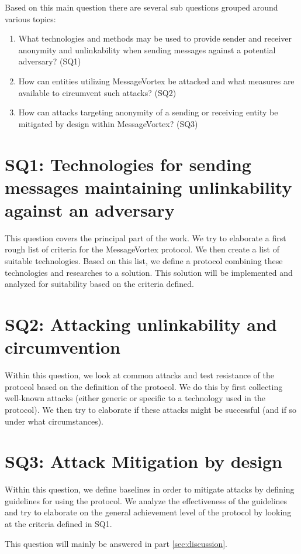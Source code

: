 Based on this main question there are several sub questions grouped around various topics:

\begin{enumerate}
	\item What technologies and methods may be used to provide sender and receiver anonymity and unlinkability when sending messages against a potential adversary? (SQ1)
	\item How can entities utilizing MessageVortex be attacked and what measures are available to circumvent such attacks? (SQ2)
	\item How can attacks targeting anonymity of a sending or receiving entity be mitigated by design within MessageVortex? (SQ3)
\end{enumerate}

\section{SQ1: Technologies for sending messages maintaining unlinkability against an adversary}
This question covers the principal part of the work. We try to elaborate a first rough list of criteria for the MessageVortex protocol. We then create a list of suitable technologies. Based on this list, we define a protocol combining these technologies and researches to a solution. This solution will be implemented and analyzed for suitability based on the criteria defined.

\section{SQ2: Attacking unlinkability and circumvention}
Within this question, we look at common attacks and test resistance of the protocol based on the definition of the protocol. We do this by first collecting well-known attacks (either generic or specific to a technology used in the protocol). We then try to elaborate if these attacks might be successful (and if so under what circumstances).

\section{SQ3: Attack Mitigation by design}
Within this question, we define baselines in order to mitigate attacks by defining guidelines for using the protocol. We analyze the effectiveness of the guidelines and try to elaborate on the general achievement level of the protocol by looking at the criteria defined in SQ1. 

This question will mainly be answered in part \ref{sec:discussion}.
